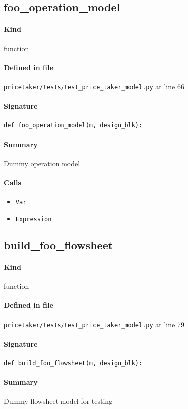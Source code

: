 \documentclass[11pt]{report}
\begin{document}
\subsection{foo\_operation\_model}
\label{def:pricetaker-tests-test_price_taker_model.py:foo_operation_model:L66}
\paragraph{Kind} function
\paragraph{Defined in file} \texttt{pricetaker/tests/test\_price\_taker\_model.py} at line 66
\paragraph{Signature} \texttt{def foo\_operation\_model(m, design\_blk):}
\paragraph{Summary} Dummy operation model
\paragraph{Calls}
\begin{itemize}[leftmargin=*]
  \item \texttt{Var}
  \item \texttt{Expression}
\end{itemize}
\subsection{build\_foo\_flowsheet}
\label{def:pricetaker-tests-test_price_taker_model.py:build_foo_flowsheet:L79}
\paragraph{Kind} function
\paragraph{Defined in file} \texttt{pricetaker/tests/test\_price\_taker\_model.py} at line 79
\paragraph{Signature} \texttt{def build\_foo\_flowsheet(m, design\_blk):}
\paragraph{Summary} Dummy flowsheet model for testing
\end{document}
